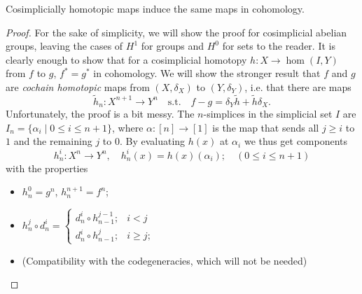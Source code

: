\documentclass[a4paper,openany]{scrbook}
\begin{document}
\begin{lemma}\label{lemma:cosimphomotopicmaps}
Cosimplicially homotopic maps induce the same maps in cohomology.
\end{lemma}
\begin{proof}
For the sake of simplicity, we will show the proof for cosimplicial abelian groups, leaving the cases of $H^1$ for groups and $H^0$ for sets to the reader. It is clearly enough to show that for a cosimplicial homotopy $h\colon X \to \hom(I,Y)$ from $f$ to $g$, $f^*=g^*$ in cohomology. We will show the stronger result that $f$ and $g$ are \emph{cochain homotopic} maps from $(X,\delta_X)$ to $(Y,\delta_Y)$, i.e. that there are maps
\[
\tilde h_n \colon X^{n+1} \to Y^n \quad \text{s.t.}\quad f-g = \delta_Y \tilde h + \tilde h \delta_X.
\]
Unfortunately, the proof is a bit messy. The $n$-simplices in the simplicial set $I$ are $I_n = \{ \alpha_i \mid 0 \leq i \leq n+1\}$, where $\alpha\colon [n] \to [1]$ is the map that sends all $j \geq i$ to $1$ and the remaining $j$ to $0$. By evaluating $h(x)$ at $\alpha_i$ we thus get components
\[
h_n^i\colon X^n \to Y^n, \quad h^i_n(x) = h(x)(\alpha_i); \quad (0 \leq i \leq n+1)
\]
with the properties
\begin{itemize}
	\item $h_n^0=g^n$, $h_n^{n+1}=f^n$;
	\item $h_n^j \circ d_n^i = \begin{cases}
		d^i_n \circ h_{n-1}^{j-1}; & i < j\\
		d^i_n \circ h_{n-1}^j; & i \geq j;
	\end{cases}$
	\item (Compatibility with the codegeneracies, which will not be needed)
\end{itemize}


\end{proof}
\end{document}
